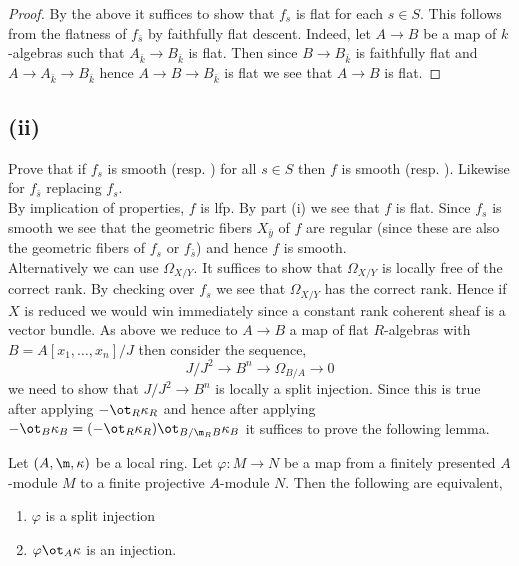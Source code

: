 \documentclass[12pt]{article}
\begin{document}
\begin{proof}
By the above it suffices to show that $f_s$ is flat for each $s \in S$. This follows from the flatness of $f_{\bar{s}}$ by faithfully flat descent. Indeed, let $A \to B$ be a map of $k$-algebras such that $A_{\bar{k}} \to B_{\bar{k}}$ is flat. Then since $B \to B_{\bar{k}}$ is faithfully flat and $A \to A_{\bar{k}} \to B_{\bar{k}}$ hence $A \to B \to B_{\bar{k}}$ is flat we see that $A \to B$ is flat. 
\end{proof}

\subsection{(ii)}

Prove that if $f_s$ is smooth (resp. \etale) for all $s \in S$ then $f$ is smooth (resp. \etale). Likewise for $f_{\bar{s}}$ replacing $f_s$.
\bigskip\\
By implication of properties, $f$ is lfp.
By part (i) we see that $f$ is flat. Since $f_s$ is smooth we see that the geometric fibers $X_{\bar{y}}$ of $f$ are regular (since these are also the geometric fibers of $f_s$ or $f_{\bar{s}}$) and hence $f$ is smooth.
\bigskip\\
Alternatively we can use $\Omega_{X/Y}$. It suffices to show that $\Omega_{X/Y}$ is locally free of the correct rank. By checking over $f_s$ we see that $\Omega_{X/Y}$ has the correct rank. Hence if $X$ is reduced we would win immediately since a constant rank coherent sheaf is a vector bundle. As above we reduce to $A \to B$ a map of flat $R$-algebras with $B = A[x_1, \dots, x_n]/J$ then consider the sequence,
\[ J/J^2 \to B^n \to \Omega_{B/A} \to 0 \]
we need to show that $J/J^2 \to B^n$ is locally a split injection. Since this is true after applying $- \ot_R \kappa_R$ and hence after applying $- \ot_B \kappa_B = (- \ot_R \kappa_R) \ot_{B/\m_R B} \kappa_B$ it suffices to prove the following lemma.

\begin{lemma}
Let $(A, \m, \kappa)$ be a local ring. Let $\varphi : M \to N$ be a map from a finitely presented $A$-module $M$ to a finite projective $A$-module $N$. Then the following are equivalent,
\begin{enumerate}
\item $\varphi$ is a split injection
\item $\varphi \ot_A \kappa$ is an injection.
\end{enumerate}
\end{lemma}
\end{document}
